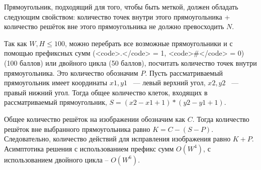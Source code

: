 \solutionSection

Прямоугольник, подходящий для того, чтобы быть меткой, должен обладать следующим свойством: количество точек внутри этого прямоугольника + количество решёток вне этого прямоугольника не должно превосходить $N$.

Так как $W, H \le 100$, можно перебрать все возможные прямоугольники и с помощью префиксных сумм (<code>.</code> = 1, <code>\#</code> = 0) (100 баллов)  или двойного цикла (50 баллов), посчитать количество точек внутри прямоугольника. Это количество обозначим $P$. Пусть рассматриваемый прямоугольник имеет координаты $x1, y1$ ~--- левый верхний угол, $x2, y2$ ~--- правый нижний угол. Тогда общее количество клеток, входящих в рассматриваемый прямоугольник, $S = (x2 - x1 + 1) * (y2 - y1 + 1)$.

Общее количество решёток на изображении обозначим как $C$. Тогда количество решёток вне выбранного прямоугольника равно $K = C - (S - P)$. Следовательно, количество действий для исправления изображения равно $K + P$. Асимптотика решения с использованием префикс сумм $O(W^4)$, с использованием двойного цикла -- $O(W^6)$.

\codeExample

